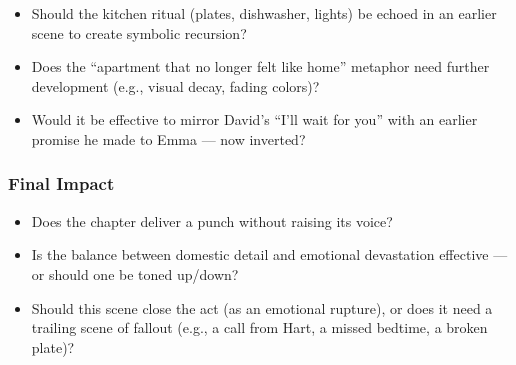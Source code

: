 \begin{itemize}
  \item Should the kitchen ritual (plates, dishwasher, lights) be echoed in an earlier scene to create symbolic recursion?
  \item Does the “apartment that no longer felt like home” metaphor need further development (e.g., visual decay, fading colors)?
  \item Would it be effective to mirror David’s “I’ll wait for you” with an earlier promise he made to Emma — now inverted?
\end{itemize}

\subsubsection*{Final Impact}

\begin{itemize}
  \item Does the chapter deliver a punch without raising its voice?
  \item Is the balance between domestic detail and emotional devastation effective — or should one be toned up/down?
  \item Should this scene close the act (as an emotional rupture), or does it need a trailing scene of fallout (e.g., a call from Hart, a missed bedtime, a broken plate)?
\end{itemize}
